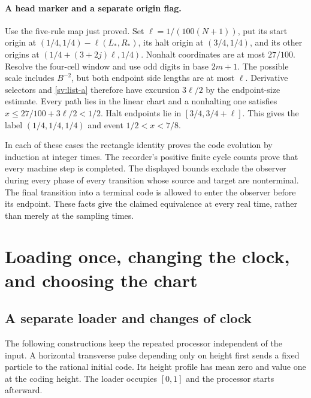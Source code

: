 \paragraph{A head marker and a separate origin flag.}
Use the five-rule map just proved.
Set $\ell=1/(100(N+1))$, put its start origin at
$(1/4,1/4)-\ell(L_*,R_*)$, its halt origin at $(3/4,1/4)$,
and its other origins at $(1/4+(3+2j)\ell,1/4)$.
Nonhalt coordinates are at most $27/100$.  Resolve the four-cell
window and use odd digits in base $2m+1$.  The possible scale includes
$B^{-2}$, but both endpoint side lengths are at most $\ell$.
Derivative selectors and \eqref{sv:list-a} therefore have excursion
$3\ell/2$ by the endpoint-size estimate.  Every path lies in the
linear chart and a nonhalting one satisfies
$x\le27/100+3\ell/2<1/2$.  Halt endpoints lie in
$[3/4,3/4+\ell]$.  This gives the label $(1/4,1/4,1/4)$
and event $1/2<x<7/8$.

In each of these cases the rectangle identity proves the code evolution
by induction at integer times.  The recorder's positive finite cycle
counts prove that every machine step is completed.  The displayed bounds
exclude the observer during every phase of every transition whose source
and target are nonterminal.  The final transition into a terminal code
is allowed to enter the observer before its endpoint.  These facts give
the claimed equivalence at every real time, rather than merely at the
sampling times.

\section{Loading once, changing the clock, and choosing the chart}
\label{sv:reciprocal-applications}



\subsection{A separate loader and changes of clock}
\label{sv:loaded-options}
The following constructions keep the repeated processor independent of
the input.  A horizontal transverse pulse depending only on height
first sends a fixed particle to the rational initial code.  Its height
profile has mean zero and value one at the coding height.  The loader
occupies $[0,1]$ and the processor starts afterward.

